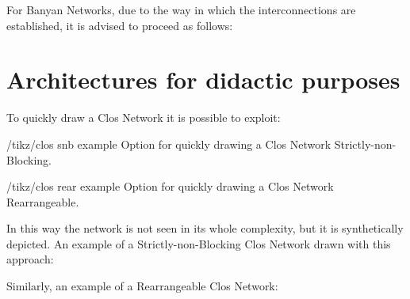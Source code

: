 \documentclass{ltxdoc}
\begin{document}
For Banyan Networks, due to the way in which the interconnections are established, it is advised to proceed as follows:
\begin{codeexample}[]
\end{codeexample}

\section{Architectures for didactic purposes}
\label{sec:dida}
To quickly draw a Clos Network  it is possible to exploit:
\begin{key}{/tikz/clos snb example}
    Option for quickly drawing a Clos Network Strictly-non-Blocking.
\end{key}
\begin{key}{/tikz/clos rear example}
    Option for quickly drawing a Clos Network Rearrangeable.
\end{key}
In this way the network is not seen in its whole complexity, but it is synthetically  depicted. An example of a Strictly-non-Blocking Clos Network drawn with this approach:
\begin{codeexample}[]
\end{codeexample}

Similarly, an example of a Rearrangeable Clos Network:
\begin{codeexample}[]
\end{codeexample}
\end{document}
